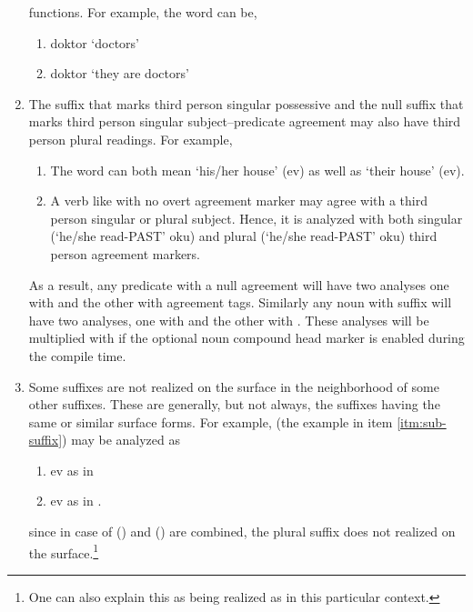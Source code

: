 \documentclass[twocolumn]{article}
\begin{document}
\begin{enumerate}
functions. For example, the word  can be,
    \begin{enumerate}
    \item doktor `doctors'
    \item doktor `they are doctors'
    \end{enumerate}
\item\label{itm:3p-3s} The suffix  that marks third person
singular possessive and the null suffix that marks third person
singular subject--predicate agreement may also have third person
plural readings. For example,
    \begin{enumerate}
    \item The word  can both mean `his/her house'
    (ev) as well as `their house' (ev).
    \item A verb like  with no overt
    agreement marker may agree with a third person singular or plural
    subject. Hence, it is analyzed with 
    both singular (`he/she read-PAST' oku) 
    and plural (`he/she read-PAST' oku) 
    third person agreement markers.
    \end{enumerate}

As a result, any predicate with a null agreement will have two
analyses one with   and the other with  agreement
tags. Similarly any noun with suffix  will have two
analyses, one with  and the other with . These
analyses will be multiplied with  if the optional noun
compound head marker is enabled during the compile time.

\item\label{itm:null-suffix} Some suffixes are not realized on the surface in the neighborhood of some other suffixes. These are generally, but not always, the suffixes having the same or similar surface forms. For example,  (the example in item \ref{itm:sub-suffix}) may be analyzed as
    \begin{enumerate}
    \item ev  as in 
    \item ev as in .
    \end{enumerate}
since in case of  () and  ()
are combined, the plural suffix  does not realized on the
surface.\footnote{One can also explain this as  being
realized as  in this particular context.}


\end{enumerate}
\end{document}
